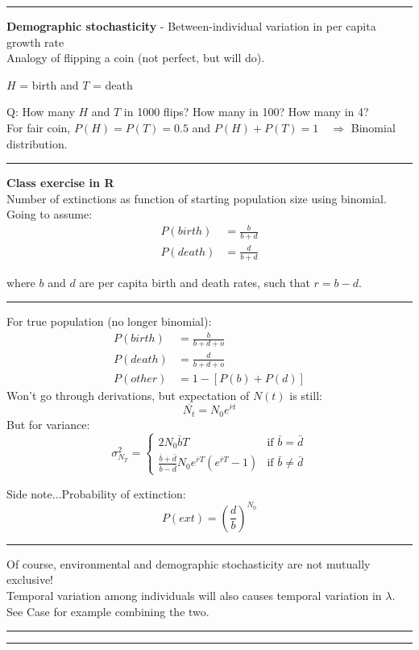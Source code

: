 \documentclass{article}
\newcommand{\note}[1]{\colorbox{gray!20}{#1}}
\begin{document}
\rule[0.5ex]{\linewidth}{1pt}


\textbf{Demographic stochasticity} - Between-individual variation in per capita growth rate\\
Analogy of flipping a coin (not perfect, but will do).
\begin{center}
	$H$ = birth and $T$ = death
\end{center}
\note{Q:} How many $H$ and $T$ in 1000 flips?  How many in 100?  How many in 4?\\
For fair coin, $P(H)=P(T)=0.5$ and $P(H)+P(T)=1 \quad \Rightarrow $ Binomial distribution.

\rule[0.5ex]{\linewidth}{1pt}
\textbf{Class exercise in R}\\
Number of extinctions as function of starting population size using binomial.\\
Going to assume:
\begin{align*}
	P(birth)&=\frac{b}{b+d}\\
	P(death)&=\frac{d}{b+d}
\end{align*}
\begin{center}
	where $b$ and $d$ are per capita birth and death rates, such that $r=b-d$.
\end{center}

\rule[0.5ex]{\linewidth}{1pt}
For true population (no longer binomial):
\begin{align*}
	P(birth)&=\frac{b}{b+d+o}\\
	P(death)&=\frac{d}{b+d+o}\\
	P(other)&=1-[P(b)+P(d)]
\end{align*}
Won't go through derivations, but expectation of $N(t)$ is still:
\begin{equation*}
	\overline{N_t}=N_0 e^{\bar{r}t}
\end{equation*}
But for variance:
\begin{equation*}
  \sigma_{N_T}^2 =
  \begin{cases} 
        2N_0 \bar{b} T & \text{if } \bar{b}=\bar{d} \\
        \frac{\bar{b}+\bar{d}}{\bar{b}-\bar{d}} N_0 e^{\bar{r}T}(e^{\bar{r}T}-1) & \text{if } \bar{b} \neq \bar{d}
    \end{cases}
 \end{equation*}

Side note...Probability of extinction:
\begin{equation*}
	P(ext)=\left(\frac{d}{b}\right)^{N_0}
\end{equation*}

\rule[0.5ex]{\linewidth}{1pt}
Of course, environmental and demographic stochasticity are not mutually exclusive!\\  
Temporal variation among individuals will also causes temporal variation in $\lambda$.\\
See Case for example combining the two.

\rule[0.5ex]{\linewidth}{1pt}
\rule[0.5ex]{\linewidth}{1pt}
\end{document}
